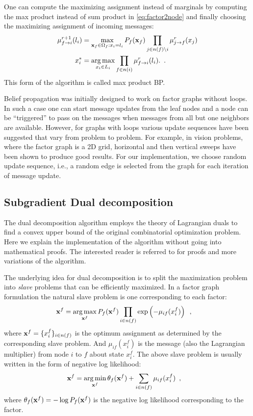 \documentclass[letterpaper, 10 pt, conference]{ieeeconf} %
\DeclareMathOperator*{\argmin}{arg\,min}
\DeclareMathOperator*{\argmax}{arg\,max}
\begin{document}
One can compute the maximizing assignment instead of marginals by computing
the max product instead of sum product in \eqref{eq:factor2node} and finally 
choosing the maximizing assignment of incoming messages:
\begin{align}
  \bpmsg{f}{i}{l_i}{r+1} &= \max_{\map_f \in \Omega_f: x_i =
l_i}P_f(\map_f)\prod_{j \in n(f) \setminus i}\bpmsg{j}{f}{x_j}{r}
\label{eq:maxproduct}
\\
x_i^* &= \argmax_{x_i \in L_i} \prod_{f \in n(i)}\bpmsg{f}{i}{l_i}{r}.
\enspace.
\end{align}
This form of the algorithm is called max product BP.

Belief propagation was initially designed to work on factor graphs without
loops. In such a case one can start message updates from the leaf nodes and
a node can be ``triggered'' to pass on the messages when messages from all 
but one neighbors are available. However, for graphs with loops various update
sequences have been suggested that vary from problem to problem. For example,
in vision problems, where the factor graph is a 2D grid, horizontal and then
vertical sweeps have been shown to produce good results.
For our implementation, we choose random update sequence, i.e., a random edge is
selected from the graph for each iteration of message update.

\subsection{Subgradient Dual decomposition}
\newcommand{\msg}[3]{\mu_{#1#2}(#3)}
\newcommand{\assign}{\leftarrow}
\newcommand{\Sx}{L_i}

The dual decomposition algorithm employs the theory of Lagrangian duals to find a
convex upper bound of the original combinatorial optimization problem.
Here we explain the implementation of the
algorithm without going into mathematical proofs. The interested reader is
referred to
\cite{sontag2011introduction,jojic2010accelerated,komodakis2009beyond} for
proofs and more variations of the algorithm. 

The underlying idea for dual decomposition is to split the maximization
problem into \emph{slave} problems that can be efficiently maximized. In a
factor graph formulation the natural slave problem is one corresponding
to each factor:
\begin{align}
  \map^f &= \argmax\limits_{\map^f} P_f(\map^f)
  \prod\limits_{i \in n(f)}\exp\left(-\msg{i}{f}{x^f_i} \right)
  \enspace,
\end{align}
where $\mathbf{x}^f = \{x_i^f\}_{i \in n(f)}$ is the optimum assignment 
as determined by the corresponding slave
problem. And $\msg{i}{f}{x^f_i}$ is the message (also the Lagrangian
multiplier) from node $i$ to $f$ about state $x^f_i$. 
The above slave problem is usually written in the form of 
negative log likelihood:
\begin{align}
  \map^f &= \argmin\limits_{\map^f} \theta_f(\map^f)
  +\sum\limits_{i \in n(f)}\msg{i}{f}{x^f_i}
  \enspace,
  \label{eq:slavemin}
\end{align}
where $\theta_f(\mathbf{x}^f) = -\log P_f(\mathbf{x}^f)$ is the negative log
likelihood corresponding to the factor.
\end{document}
